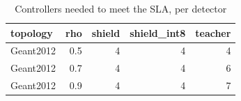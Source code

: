 \begin{table}
\caption{Controllers needed to meet the SLA, per detector}
\begin{tabular}{lrrrr}
\toprule
topology & rho & shield & shield_int8 & teacher \\
\midrule
Geant2012 & 0.5 & 4 & 4 & 4 \\
Geant2012 & 0.7 & 4 & 4 & 6 \\
Geant2012 & 0.9 & 4 & 4 & 7 \\
\bottomrule
\end{tabular}
\end{table}
